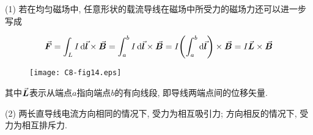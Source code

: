 \begin{note}
	
	(1) 若在均匀磁场中, 任意形状的载流导线在磁场中所受力的磁场力还可以进一步写成
	
	\begin{equation*}
		\va*{F} = \int_{L} I \dd{\va*{l}} \times \va*{B} = \int_{a}^{b} I \dd{\va*{l}} \times \va*{B} = I \qty(\int_{a}^{b} \dd{\va*{l}}) \times \va*{B} = I \va*{L} \times \va*{B}
	\end{equation*}
	
	\begin{figure}[H]
		\centering
		\texttt{[image: C8-fig14.eps]}
	\end{figure}
	
	其中$\va*{L}$表示从端点$a$指向端点$b$的有向线段, 即导线两端点间的位移矢量. 
	
	(2) 两长直导线电流方向相同的情况下, 受力为相互吸引力; 方向相反的情况下, 受力为相互排斥力.
	
	
\end{note}


